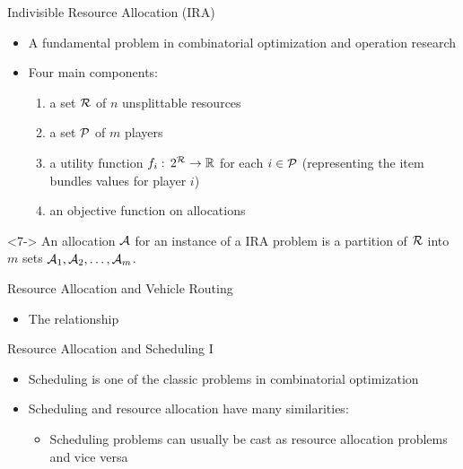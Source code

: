 \documentclass[10pt]{beamer}
\begin{document}
\begin{frame}{Indivisible Resource Allocation (IRA)}
\begin{itemize}
	\item<1-> A fundamental problem in combinatorial optimization and operation research	
	\item<2-> Four main components:
	\begin{enumerate}
		\item<3-> a set $\mathcal{R}$ of $n$ unsplittable resources
		\item<4-> a set $\mathcal{P}$ of $m$ players
		\item<5-> a \alert{utility} function $f_{i}: \, 2^{\mathcal{R}} \rightarrow \mathbb{R}$ for each $i \in \mathcal{P}$ (representing the item bundles values for player $i$)
		\item<6-> an objective function on \alert{allocations}
	\end{enumerate}
\end{itemize}
\begin{definition}[Allocation]<7->
An allocation $\mathcal{A}$ for an instance of a \textsc{IRA} problem is a partition of $\mathcal{R}$ into $m$ sets $\mathcal{A}_{1}, \mathcal{A}_{2}, \ldots, \mathcal{A}_{m}$.
\end{definition}
\end{frame}

\begin{frame}{Resource Allocation and Vehicle Routing}
\begin{itemize}
    \item The relationship
\end{itemize}
    
\end{frame}

\begin{frame}{Resource Allocation and Scheduling I}
\begin{itemize}
	\item<1-> Scheduling is one of the classic problems in combinatorial optimization
	\item<3-> Scheduling and resource allocation have many similarities:
	\begin{itemize}
	    \item<4-> Scheduling problems can usually be cast as resource allocation problems and vice versa 
	\end{itemize}
\end{itemize}
\end{frame}
\end{document}
